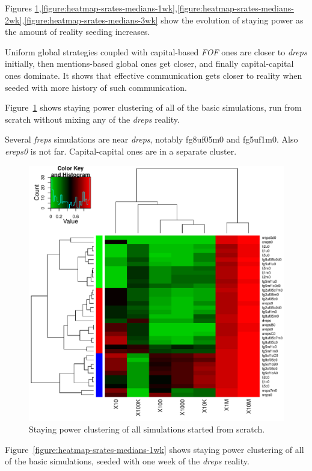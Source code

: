 \documentclass[10pt,oneside]{memoir}
\begin{document}
\begin{Spacing}{2}
Figures \ref{figure:heatmap-srates-medians-0wk},\ref{figure:heatmap-srates-medians-1wk},\ref{figure:heatmap-srates-medians-2wk},\ref{figure:heatmap-srates-medians-3wk} show the evolution of staying power as the amount of reality seeding increases.  


Uniform global strategies coupled with capital-based {\itshape FOF} ones are closer to {\itshape dreps} initially, then mentions-based global ones get closer, and finally capital-capital ones dominate.  It shows that effective communication gets closer to reality when seeded with more history of such communication.


Figure~\ref{figure:heatmap-srates-medians-0wk} shows staying power clustering of all of the basic simulations, run from scratch without mixing any of the {\itshape dreps} reality.


Several {\itshape freps} simulations are near {\itshape dreps}, notably fg8uf05m0 and fg5uf1m0.  Also {\itshape ereps0} is not far.  Capital-capital ones are in a separate cluster.



\begin{figure}
\begin{center}
    \includegraphics{figures/heatmap-srates-medians-0wk}
    \caption{Staying power clustering of all simulations started from scratch.}
    \label{figure:heatmap-srates-medians-0wk}
\end{center}
\end{figure}
Figure~\ref{figure:heatmap-srates-medians-1wk} shows staying power clustering of all of the basic simulations, seeded with one week of the {\itshape dreps} reality.



\end{Spacing}
\end{document}
